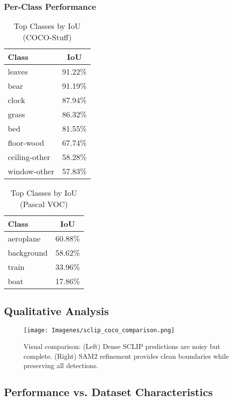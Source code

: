 \subsubsection{Per-Class Performance}

\begin{table}[h]
\centering
\caption{Top Classes by IoU (COCO-Stuff)}
\label{tab:per_class_coco}
\begin{tabular}{lc}
\hline
\textbf{Class} & \textbf{IoU} \\
\hline
leaves & 91.22\% \\
bear & 91.19\% \\
clock & 87.94\% \\
grass & 86.32\% \\
bed & 81.55\% \\
floor-wood & 67.74\% \\
ceiling-other & 58.28\% \\
window-other & 57.83\% \\
\hline
\end{tabular}
\end{table}

\begin{table}[h]
\centering
\caption{Top Classes by IoU (Pascal VOC)}
\label{tab:per_class_voc}
\begin{tabular}{lc}
\hline
\textbf{Class} & \textbf{IoU} \\
\hline
aeroplane & 60.88\% \\
background & 58.62\% \\
train & 33.96\% \\
boat & 17.86\% \\
\hline
\end{tabular}
\end{table}

\subsection{Qualitative Analysis}

\begin{figure}[h]
\centering
\texttt{[image: Imagenes/sclip\_coco\_comparison.png]}
\caption{Visual comparison: (Left) Dense SCLIP predictions are noisy but complete. (Right) SAM2 refinement provides clean boundaries while preserving all detections.}
\label{fig:sclip_comparison}
\end{figure}

\subsection{Performance vs. Dataset Characteristics}

